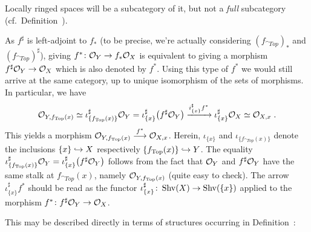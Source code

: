 \documentclass[a4paper,parskip=half,numbers=enddot, DIV=12]{scrreprt}
\begin{document}
\begin{rem*}
    Locally ringed spaces will be a subcategory of it, but not a \emph{full} subcategory (cf.\ Definition~).
\end{rem*}
\begin{rem*}
    As $f^\sharp$ is left-adjoint to $f_*$ (to be precise, we're actually considering  $(f_{\cat{Top}})_*$ and $(f_{\cat{Top}})^\sharp$), giving $f^*\colon \mathcal{O}_Y\to f_*\mathcal{O}_X$ is equivalent to giving a morphism $f^\sharp \mathcal{O}_Y \to \mathcal{O}_X$ which is also denoted by $f^*$. Using this type of $f^*$ we would still arrive at the same category, up to unique isomorphism of the sets of morphisms. In particular, we have 
    \begin{align*}
    	\mathcal{O}_{Y,f_{\operatorname{Top}}(x)} \simeq \iota_{\{f_{\operatorname{Top}}(x)\}}^\sharp \mathcal{O}_Y = \iota_{\{x\}}^\sharp \big(f^\sharp \mathcal{O}_Y\big)  \xrightarrow{i^\sharp_{\{x\}}f^*} \iota^\sharp_{\{x\}} \mathcal{O}_X \simeq \mathcal{O}_{X,x}\;. 
    \end{align*}
    This yields a morphism $\Oo_{Y,f_{\cat{Top}}(x)} \morphism[f^*] \Oo_{X,x}$. Herein, $\iota_{\{x\}}$ and $\iota_{\{f_{\cat{Top}}(x)\}}$ denote the inclusions $\{x\}\monomorphism X$ respectively $\{f_{\cat{Top}}(x)\}\monomorphism Y$. The equality $\iota_{\{f_{\operatorname{Top}}(x)\}}^\sharp \mathcal{O}_Y = \iota_{\{x\}}^\sharp \big(f^\sharp \mathcal{O}_Y\big)$ follows from the fact that $\mathcal{O}_Y$ and $f^\sharp\mathcal{O}_Y$ have the same stalk at $f_{\cat{Top}}(x)$, namely $\mathcal{O}_{Y,f_{\operatorname{Top}}(x)}$ (quite easy to check). The arrow $\iota_{\{x\}}^\sharp f^*$ should be read as the functor $\iota_{\{x\}}^\sharp\colon\cat{Shv}(X)\morphism\cat{Shv}(\{x\})$ applied to the morphism $f^*\colon f^\sharp\Oo_Y\morphism\Oo_X$.
    
    This may be described directly in terms of structures occurring in Definition~:
\end{rem*}
\end{document}
